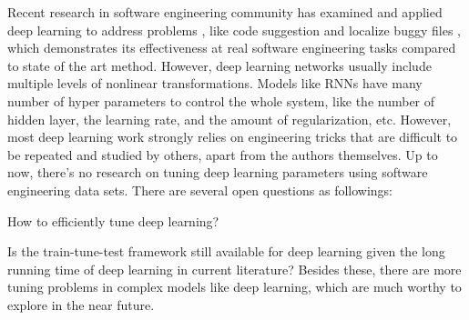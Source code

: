 Recent research in software engineering community has examined and applied deep learning to address problems
, like code suggestion \cite{white2015toward} and localize buggy files \cite{lam2015combining}, which demonstrates its effectiveness at real software engineering tasks compared to state of the art method. However, deep learning networks usually include multiple levels of nonlinear transformations\cite{bengio2009learning}. Models like RNNs have many number of hyper parameters to control the whole system, like the number of hidden layer, the learning rate, and the amount of regularization, etc. However, most deep learning work strongly relies on engineering tricks that are difficult to be repeated and studied by others, apart from the authors themselves\cite{zhou2014big}. Up to now, there's no research on tuning deep learning parameters using software engineering data sets. There are several open questions as followings:
\bi
\item How to efficiently tune deep learning? 
\item Is the train-tune-test framework still available for deep learning given the long running time of deep learning in current literature?
\ei
Besides these, there are more tuning problems in complex models like deep learning, which 
are much worthy to explore in the near future.